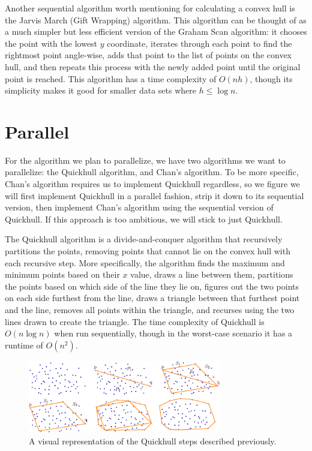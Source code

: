 \documentclass[12pt]{article}
\begin{document}
Another sequential algorithm worth mentioning for calculating a convex hull is the Jarvis March (Gift Wrapping) algorithm. This algorithm can be thought of as a much simpler but less efficient version of the Graham Scan algorithm: it chooses the point with the lowest $y$ coordinate, iterates through each point to find the rightmost point angle-wise, adds that point to the list of points on the convex hull, and then repeats this process with the newly added point until the original point is reached. This algorithm has a time complexity of $O(nh)$, though its simplicity makes it good for smaller data sets where $h\leq\log n$.


\section{Parallel}


For the algorithm we plan to parallelize, we have two algorithms we want to parallelize: the Quickhull algorithm, and Chan’s algorithm. To be more specific, Chan’s algorithm requires us to implement Quickhull regardless, so we figure we will first implement Quickhull in a parallel fashion, strip it down to its sequential version, then implement Chan’s algorithm using the sequential version of Quickhull. If this approach is too ambitious, we will stick to just Quickhull.

The Quickhull algorithm is a divide-and-conquer algorithm that recursively partitions the points, removing points that cannot lie on the convex hull with each recursive step. More specifically, the algorithm finds the maximum and minimum points based on their $x$ value, draws a line between them, partitions the points based on which side of the line they lie on, figures out the two points on each side furthest from the line, draws a triangle between that furthest point and the line, removes all points within the triangle, and recurses using the two lines drawn to create the triangle. The time complexity of Quickhull is $O(n \log n)$ when run sequentially, though in the worst-case scenario it has a runtime of $O(n^2)$.

\begin{figure}[h]
  \centering
  \includegraphics[width=0.75\textwidth]{quickhull.png}
  \caption{A visual representation of the Quickhull steps described previously.}
\end{figure}
\end{document}
